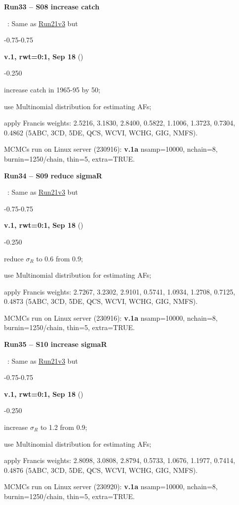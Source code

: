 \hypertarget{R33}{\textbf{Run33 -- S08 increase catch}}~: Same as \hyperlink{R21}{Run21v3} but
\begin{itemize_csas}{-0.75}{-0.75}
	\item \textbf{v.1, rwt=0:1, Sep 18} ()
	\begin{itemize_csas}{-0.25}{0}
		\item increase catch in 1965-95 by 50\pc{};
		\item use Multinomial distribution for estimating AFs;
		\item apply Francis weights: 2.5216, 3.1830, 2.8400, 0.5822, 1.1006, 1.3723, 0.7304, 0.4862 (5ABC, 3CD, 5DE, QCS, WCVI, WCHG, GIG, NMFS).
		\item MCMCs run on Linux server (230916): \textbf{v.1a} nsamp=10000, nchain=8, burnin=1250/chain, thin=5, extra=TRUE.
	\end{itemize_csas}
\end{itemize_csas}

\hypertarget{R34}{\textbf{Run34 -- S09 reduce sigmaR}}~: Same as \hyperlink{R21}{Run21v3} but
\begin{itemize_csas}{-0.75}{-0.75}
	\item \textbf{v.1, rwt=0:1, Sep 18} ()
	\begin{itemize_csas}{-0.25}{0}
		\item reduce $\sigma_R$ to 0.6 from 0.9;
		\item use Multinomial distribution for estimating AFs;
		\item apply Francis weights: 2.7267, 3.2302, 2.9101, 0.5741, 1.0934, 1.2708, 0.7125, 0.4873 (5ABC, 3CD, 5DE, QCS, WCVI, WCHG, GIG, NMFS).
		\item MCMCs run on Linux server (230916): \textbf{v.1a} nsamp=10000, nchain=8, burnin=1250/chain, thin=5, extra=TRUE.
	\end{itemize_csas}
\end{itemize_csas}

\hypertarget{R35}{\textbf{Run35 -- S10 increase sigmaR}}~: Same as \hyperlink{R21}{Run21v3} but
\begin{itemize_csas}{-0.75}{-0.75}
	\item \textbf{v.1, rwt=0:1, Sep 18} ()
	\begin{itemize_csas}{-0.25}{0}
		\item increase $\sigma_R$ to 1.2 from 0.9;
		\item use Multinomial distribution for estimating AFs;
		\item apply Francis weights: 2.8098, 3.0808, 2.8794, 0.5733, 1.0676, 1.1977, 0.7414, 0.4876 (5ABC, 3CD, 5DE, QCS, WCVI, WCHG, GIG, NMFS).
		\item MCMCs run on Linux server (230920): \textbf{v.1a} nsamp=10000, nchain=8, burnin=1250/chain, thin=5, extra=TRUE.
	\end{itemize_csas}
\end{itemize_csas}

